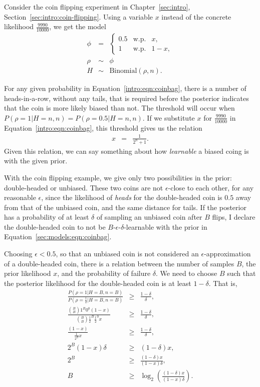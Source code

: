 Consider the coin flipping experiment in Chapter~\ref{sec:intro}, Section~\ref{sec:intro:coin-flipping}. Using a variable $x$ instead of the concrete likelihood $\frac{9990}{10000}$, we get the model
\begin{eqnarray}
\label{sec:models:eqn:coinbag}
\phi &=& \left\{\begin{array}{lll}
0.5 & \mbox{w.p.} & x,\\
1 & \mbox{w.p.} & 1-x,
\end{array}\right.\\
\rho &\sim&
\phi\\
\label{}H &\sim& \mbox{Binomial}(\rho, n).
\end{eqnarray}

For any given probability in Equation~\ref{intro:eqn:coinbag}, there is a number of heads-in-a-row, without any tails, that is required before the posterior indicates that the coin is more likely biased than not. The threshold will occur when $P(\rho=1|H=n,n)=P(\rho=0.5|H=n,n)$. If we substitute $x$ for $\frac{9990}{10000}$ in Equation~\ref{intro:eqn:coinbag}, this threshold gives us the relation
\begin{eqnarray}
x &=& \frac{1}{2^n+1}.
\end{eqnarray}
Given this relation, we can say something about how \emph{learnable} a biased coing is with the given prior.


With the coin flipping example, we give only two possibilities in the prior: double-headed or unbiased. These two coins are not $\epsilon$-close to each other, for any reasonable $\epsilon$, since the likelihood of \emph{heads} for the double-headed coin is $0.5$ away from that of the unbiased coin, and the same distance for tails. If the posterior has a probability of at least $\delta$ of sampling an unbiased coin after $B$ flips, I declare the double-headed coin to not be $B$-$\epsilon$-$\delta$-learnable with the prior in Equation~\ref{sec:models:eqn:coinbag}.

Choosing $\epsilon<0.5$, so that an unbiased coin is not considered an $\epsilon$-approximation of a double-headed coin, there is a relation between the number of samples $B$, the prior likelihood $x$, and the probability of failure $\delta$. We need to choose $B$ such that the posterior likelihood for the double-headed coin is at least $1-\delta$. That is,
\begin{eqnarray}
\frac
 {P(\rho=1|H=B,n=B)}
 {P(\rho=\frac{1}{2}|H=B,n=B)}
&\geq&
\frac
 {1-\delta}
 {\delta},\\
\frac
 {{B \choose B}1^B0^0 (1-x)} 
 {{B \choose B}{\frac{1}{2}}^B{\frac{1}{2}}^0 x}
&\geq&
\frac
 {1-\delta}
 {\delta},\\
\frac
 {(1-x)} 
 {{\frac{1}{2^B}} x}
&\geq&
\frac
 {1-\delta}
 {\delta},\\
 2^B(1-x)\delta 
 &\geq&
 (1-\delta)x,\\
 2^B 
 &\geq&
\frac
 {(1-\delta)x}
 {(1-x)\delta},\\
%
B &\geq& \log_2\left(\frac
 {(1-\delta)x}
 {(1-x)\delta}
 \right).
\end{eqnarray}

